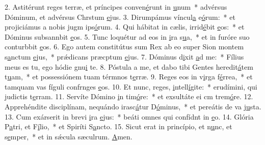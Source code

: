 2. Astitérunt reges terræ, et príncipes conven\uline{é}runt in \uline{u}num~* advérsus Dóminum, et advérsus Chrstum \uline{e}jus.
3. Dirumpámus víncul\uline{a} e\uline{ó}rum:~* et projiciámus a nobis jugm ips\uline{ó}rum.
4. Qui hábitat in cælis, irrid\uline{é}bit \uline{e}os:~* et Dóminus subsannbit \uline{e}os.
5. Tunc loquétur ad eos in \uline{i}ra s\uline{u}a,~* et in furóre suo conturbbit \uline{e}os.
6. Ego autem constitútus sum Rex ab eo super Sion montem s\uline{a}nctum \uline{e}jus,~* prǽdicans præcptum \uline{e}jus.
7. Dóminus d\uline{i}xit \uline{a}d me:~* Fílius meus es tu, ego hódie gnu\uline{i} te.
8. Póstula a me, et dabo tibi Gentes heredit\uline{á}tem t\uline{u}am,~* et possessiónem tuam térmnos t\uline{e}rræ.
9. Reges eos in v\uline{i}rga f\uline{é}rrea,~* et tamquam vas fíguli confrnges \uline{e}os.
10. Et nunc, reges, \uline{i}ntell\uline{í}gite:~* erudímini, qui judictis t\uline{e}rram.
11. Servíte Dómino \uline{i}n tim\uline{ó}re:~* et exsultáte ei cm trem\uline{ó}re.
12. Apprehéndite disciplínam, nequándo irasc\uline{á}tur D\uline{ó}minus,~* et pereátis de va j\uline{u}sta.
13. Cum exárserit in brevi \uline{i}ra \uline{e}jus:~* beáti omnes qui confídnt in \uline{e}o.
14. Glória P\uline{a}tri, et F\uline{í}lio,~* et Spiríti S\uline{a}ncto.
15. Sicut erat in princípio, et n\uline{u}nc, et s\uline{e}mper,~* et in sǽcula sæculrum. \uline{A}men.
